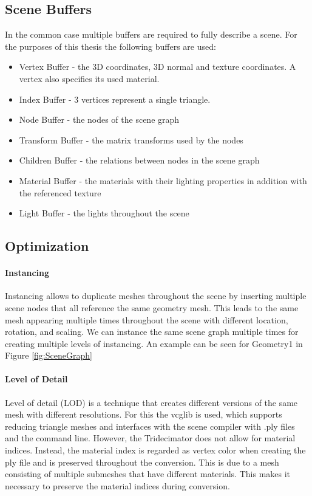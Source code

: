 \subsection{Scene Buffers}
\label{sec:SceneBuffers}
In the common case multiple buffers are required to fully describe a scene. For the purposes of this thesis the following buffers are used:
\begin{itemize}
    \item Vertex Buffer - the 3D coordinates, 3D normal and texture coordinates. A vertex also specifies its used material.
    \item Index Buffer - 3 vertices represent a single triangle.
    \item Node Buffer - the nodes of the scene graph
    \item Transform Buffer - the matrix transforms used by the nodes
    \item Children Buffer - the relations between nodes in the scene graph
    \item Material Buffer - the materials with their lighting properties in addition with the referenced texture
    \item Light Buffer - the lights throughout the scene
\end{itemize}
\subsection{Optimization}
\paragraph{Instancing}
\label{sec:instancing}
Instancing allows to duplicate meshes throughout the scene by inserting multiple scene nodes that all reference the same geometry mesh. This leads to the same mesh appearing multiple times throughout the scene with different location, rotation, and scaling. We can instance the same scene graph multiple times for creating multiple levels of instancing. An example can be seen for Geometry1 in Figure \ref{fig:SceneGraph}
\paragraph{Level of Detail}
\label{sec:LOD}
Level of detail (LOD) is a technique that creates different versions of the same mesh with different resolutions. For this the vcglib\cite{vgcLib} is used, which supports reducing triangle meshes and interfaces with the scene compiler with .ply files and the command line. However, the Tridecimator does not allow for material indices. Instead, the material index is regarded as vertex color when creating the ply file and is preserved throughout the conversion. This is due to a mesh consisting of multiple submeshes that have different materials. This makes it necessary to preserve the material indices during conversion.
\newpage

